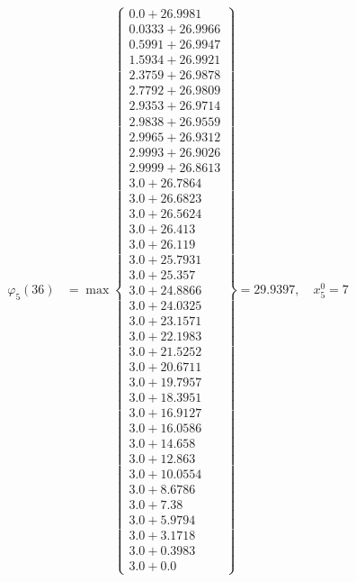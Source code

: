 \documentclass{article}
\begin{document}
\begin{align*}
  
\varphi_{5}(36) &= \max \left\{ \begin{array}{c}
0.0 + 26.9981 \\
 0.0333 + 26.9966 \\
 0.5991 + 26.9947 \\
 1.5934 + 26.9921 \\
 2.3759 + 26.9878 \\
 2.7792 + 26.9809 \\
 2.9353 + 26.9714 \\
 2.9838 + 26.9559 \\
 2.9965 + 26.9312 \\
 2.9993 + 26.9026 \\
 2.9999 + 26.8613 \\
 3.0 + 26.7864 \\
 3.0 + 26.6823 \\
 3.0 + 26.5624 \\
 3.0 + 26.413 \\
 3.0 + 26.119 \\
 3.0 + 25.7931 \\
 3.0 + 25.357 \\
 3.0 + 24.8866 \\
 3.0 + 24.0325 \\
 3.0 + 23.1571 \\
 3.0 + 22.1983 \\
 3.0 + 21.5252 \\
 3.0 + 20.6711 \\
 3.0 + 19.7957 \\
 3.0 + 18.3951 \\
 3.0 + 16.9127 \\
 3.0 + 16.0586 \\
 3.0 + 14.658 \\
 3.0 + 12.863 \\
 3.0 + 10.0554 \\
 3.0 + 8.6786 \\
 3.0 + 7.38 \\
 3.0 + 5.9794 \\
 3.0 + 3.1718 \\
 3.0 + 0.3983 \\
 3.0 + 0.0
\end{array} \right\}=29.9397,\quad x_{5}^0=7\\
  
  
\end{align*}
\end{document}
